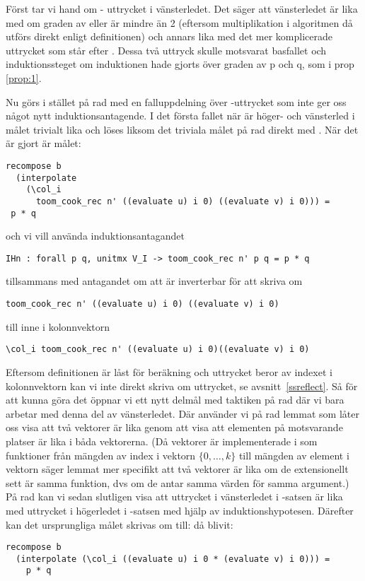 Först tar vi hand om  - uttrycket i vänsterledet.
Det säger att vänsterledet är lika med  om graden
av  eller  är mindre än 2 (eftersom multiplikation i algoritmen
då utförs direkt enligt definitionen) och annars
lika med det mer komplicerade uttrycket som står efter . Dessa två
uttryck skulle motsvarat basfallet och induktionssteget om induktionen hade
gjorts över graden av p och q, som i prop \ref{prop:1}.

Nu görs i stället på
rad  med  en falluppdelning över -uttrycket
som inte ger oss något nytt induktionsantagende.
I det första fallet när  är höger- och
vänsterled i målet trivialt lika
och löses liksom det triviala målet på rad  direkt med \C{//}.
När det är gjort är målet:
\begin{lstlisting}
recompose b
  (interpolate
    (\col_i
      toom_cook_rec n' ((evaluate u) i 0) ((evaluate v) i 0))) =
 p * q
\end{lstlisting}
och vi vill använda induktionsantagandet
\begin{lstlisting}
IHn : forall p q, unitmx V_I -> toom_cook_rec n' p q = p * q
\end{lstlisting}
tillsammans med antagandet  om att  är inverterbar för att
skriva om
\begin{lstlisting}
toom_cook_rec n' ((evaluate u) i 0) ((evaluate v) i 0)
\end{lstlisting}
till  inne i kolonnvektorn
\begin{lstlisting}
\col_i toom_cook_rec n' ((evaluate u) i 0)((evaluate v) i 0)
\end{lstlisting}
Eftersom definitionen  är låst för beräkning och uttrycket beror av
indexet  i kolonnvektorn kan vi inte direkt skriva om uttrycket, se
avsnitt~\ref{ssreflect}. Så för att kunna göra det öppnar vi ett nytt delmål
med taktiken  på rad  där vi bara arbetar med denna del av
vänsterledet. Där använder vi på rad  lemmat  som låter oss visa
att två vektorer är lika genom att visa att elementen på motsvarande platser är
lika i båda vektorerna. (Då vektorer är implementerade i \ssr som funktioner
från mängden av index i vektorn $\{0, \ldots , k\}$ till mängden av element i
vektorn säger lemmat mer specifikt att två vektorer är lika om de extensionellt
sett är samma funktion, dvs om de antar samma värden för samma argument.) På
rad  kan vi sedan slutligen visa att uttrycket i vänsterledet i
-satsen är lika med uttrycket i högerledet i -satsen med hjälp
av induktionshypotesen. Därefter kan det ursprungliga målet skrivas om till: då
blivit:
\begin{lstlisting}
recompose b
  (interpolate (\col_i ((evaluate u) i 0 * (evaluate v) i 0))) =
    p * q
\end{lstlisting}


